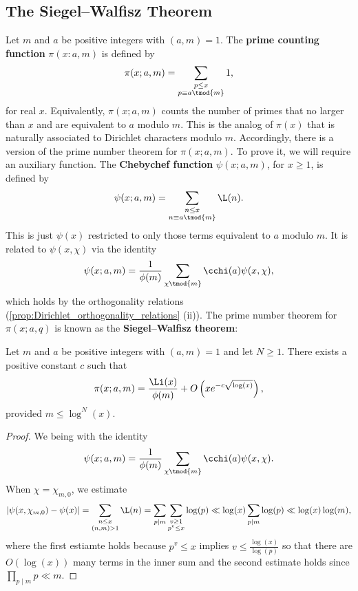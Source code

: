     \subsection*{The Siegel–Walfisz Theorem}
      Let $m$ and $a$ be positive integers with $(a,m) = 1$. The \textbf{prime counting function} $\pi(x:a,m)$ is defined by
      \[
        \pi(x;a,m) = \sum_{\substack{p \le x \\ p \equiv a \tmod{m}}}1,
      \]
      for real $x$. Equivalently, $\pi(x;a,m)$ counts the number of primes that no larger than $x$ and are equivalent to $a$ modulo $m$. This is the analog of $\pi(x)$ that is naturally associated to Dirichlet characters modulo $m$. Accordingly, there is a version of the prime number theorem for $\pi(x;a,m)$. To prove it, we will require an auxiliary function. The \textbf{Chebychef function} $\psi(x;a,m)$, for $x \ge 1$, is defined by
      \[
        \psi(x;a,m) = \sum_{\substack{n \le x \\ n \equiv a \tmod{m}}}\L(n).
      \]
      This is just $\psi(x)$ restricted to only those terms equivalent to $a$ modulo $m$. It is related to $\psi(x,\chi)$ via the identity
      \[
        \psi(x;a,m) = \frac{1}{\phi(m)}\sum_{\chi \tmod{m}}\cchi(a)\psi(x,\chi),
      \]
      which holds by the orthogonality relations (\cref{prop:Dirichlet_orthogonality_relations} (ii)). The prime number theorem for $\pi(x;a,q)$ is known as the \textbf{Siegel–Walfisz theorem}:

      \begin{theorem}
        Let $m$ and $a$ be positive integers with $(a,m) = 1$ and let $N \ge 1$. There exists a positive constant $c$ such that
        \[
          \pi(x;a,m) = \frac{\Li(x)}{\phi(m)}+O\left(xe^{-c\sqrt{\log(x)}}\right),
        \]
        provided $m \le \log^{N}(x)$.
      \end{theorem}
      \begin{proof}
        We being with the identity
        \[
          \psi(x;a,m) = \frac{1}{\phi(m)}\sum_{\chi \tmod{m}}\cchi(a)\psi(x,\chi).
        \]
        When $\chi = \chi_{m,0}$, we estimate
        \[
          |\psi(x,\chi_{m,0})-\psi(x)| = \sum_{\substack{n \le x \\ (n,m) > 1}}\L(n) = \sum_{p \mid m}\sum_{\substack{v \ge 1 \\ p^{v} \le x}}\log(p) \ll \log(x)\sum_{p \mid m}\log(p) \ll \log(x)\log(m),
        \]
        where the first estiamte holds because $p^{v} \le x$ implies $v \le \frac{\log(x)}{\log(p)}$ so that there are $O(\log(x))$ many terms in the inner sum and the second estimate holds since $\prod_{p \mid m}p \ll m$. 
      \end{proof}
